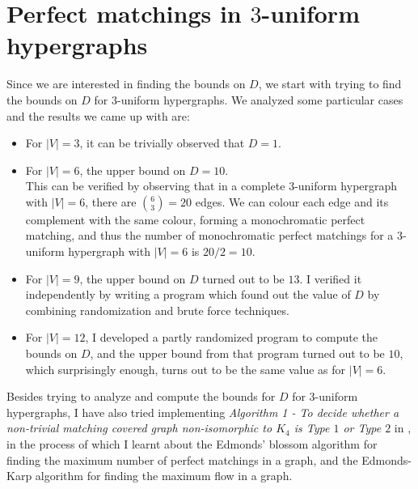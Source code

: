\documentclass[11pt]{article}
\begin{document}
\section*{Perfect matchings in $3$-uniform hypergraphs}
Since we are interested in finding the bounds on $D$, we start with trying to find the bounds on $D$ for $3$-uniform hypergraphs. We analyzed some particular cases and the results we came up with are:
\begin{itemize}
    \item For $|V|=3$, it can be trivially observed that $D=1$.
    \item For $|V|=6$, the upper bound on $D=10$. \\
    This can be verified by observing that in a complete $3$-uniform hypergraph with $|V|=6$, there are $\displaystyle\binom{6}{3}=20$ edges. We can colour each edge and its complement with the same colour, forming a monochromatic perfect matching, and thus the number of monochromatic perfect matchings for a $3$-uniform hypergraph with $|V|=6$ is $20/2=10$.
    \item For $|V|=9$, the upper bound on $D$ turned out to be $13$. I verified it independently by writing a program which found out the value of $D$ by combining randomization and brute force techniques. 
    \item For $|V|=12$, I developed a partly randomized program to compute the bounds on $D$, and the upper bound from that program turned out to be $10$, which surprisingly enough, turns out to be the same value as for $|V|=6$.
\end{itemize}

\vspace{1cm}
Besides trying to analyze and compute the bounds for $D$ for $3$-uniform hypergraphs, I have also tried implementing \textit{Algorithm 1 - To decide whether a non-trivial matching covered graph non-isomorphic to $K_4$ is Type $1$ or Type $2$} in \cite{chandran2022perfect}, in the process of which I learnt about the Edmonds' blossom algorithm for finding the maximum number of perfect matchings in a  graph, and the Edmonds-Karp algorithm for finding the maximum flow in a  graph.




\end{document}
